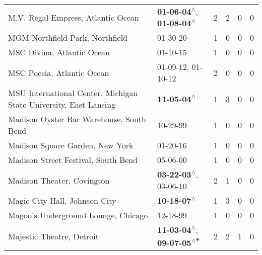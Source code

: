 \begin{supertabular}{p{0.4\textwidth}p{0.3\textwidth}p{0.05\textwidth}p{0.05\textwidth}p{0.05\textwidth}p{0.05\textwidth}}
                                           M.V. Regal Empress, Atlantic Ocean &    \textbf{01-06-04\textsuperscript{$\wedge$}}, \textbf{01-08-04\textsuperscript{$\wedge$}} &  2 &  2 &  0 &  0 \\
                                              MGM Northfield Park, Northfield &                                                                  01-30-20\textsuperscript{} &  1 &  0 &  0 &  0 \\
                                                   MSC Divina, Atlantic Ocean &                                                                  01-10-15\textsuperscript{} &  1 &  0 &  0 &  0 \\
                                                   MSC Poesia, Atlantic Ocean &                                      01-09-12\textsuperscript{}, 01-10-12\textsuperscript{} &  2 &  0 &  0 &  0 \\
            MSU International Center, Michigan State University, East Lansing &                                                 \textbf{11-05-04\textsuperscript{$\wedge$}} &  1 &  3 &  0 &  0 \\
                                     Madison Oyster Bar Warehouse, South Bend &                                                                  10-29-99\textsuperscript{} &  1 &  0 &  0 &  0 \\
                                              Madison Square Garden, New York &                                                                  01-20-16\textsuperscript{} &  1 &  0 &  0 &  0 \\
                                          Madison Street Festival, South Bend &                                                                  05-06-00\textsuperscript{} &  1 &  0 &  0 &  0 \\
                                                   Madison Theater, Covington &                     \textbf{03-22-03\textsuperscript{$\wedge$}}, 03-06-10\textsuperscript{} &  2 &  1 &  0 &  0 \\
                                                Magic City Hall, Johnson City &                                                 \textbf{10-18-07\textsuperscript{$\wedge$}} &  1 &  3 &  0 &  0 \\
                                          Magoo's Underground Lounge, Chicago &                                                                  12-18-99\textsuperscript{} &  1 &  0 &  0 &  0 \\
                                                    Majestic Theatre, Detroit &   \textbf{11-03-04\textsuperscript{$\wedge$}}, \textbf{09-07-05\textsuperscript{$\wedge$*}} &  2 &  2 &  1 &  0 \\

\end{supertabular}
